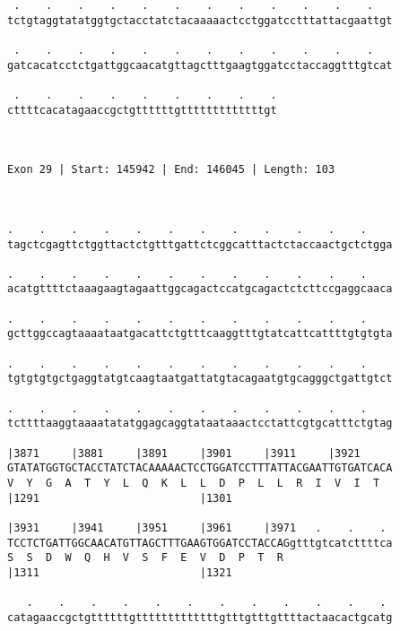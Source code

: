 \documentclass{article}
\begin{document}
\begin{Verbatim}
 .    .    .    .    .    .    .    .    .    .    .    .   
tctgtaggtatatggtgctacctatctacaaaaactcctggatcctttattacgaattgt
                                                            
 .    .    .    .    .    .    .    .    .    .    .    .   
gatcacatcctctgattggcaacatgttagctttgaagtggatcctaccaggtttgtcat
                                                            
 .    .    .    .    .    .    .    .    .
cttttcacatagaaccgctgttttttgtttttttttttttgt
                                          
                                          
 
Exon 29 | Start: 145942 | End: 146045 | Length: 103



.    .    .    .    .    .    .    .    .    .    .    .    
tagctcgagttctggttactctgtttgattctcggcatttactctaccaactgctctgga
                                                            
.    .    .    .    .    .    .    .    .    .    .    .    
acatgttttctaaagaagtagaattggcagactccatgcagactctcttccgaggcaaca
                                                            
.    .    .    .    .    .    .    .    .    .    .    .    
gcttggccagtaaaataatgacattctgtttcaaggtttgtatcattcattttgtgtgta
                                                            
.    .    .    .    .    .    .    .    .    .    .    .    
tgtgtgtgctgaggtatgtcaagtaatgattatgtacagaatgtgcagggctgattgtct
                                                            
.    .    .    .    .    .    .    .    .    .    .    .    
tcttttaaggtaaaatatatggagcaggtataataaactcctattcgtgcatttctgtag
                                                            
|3871     |3881     |3891     |3901     |3911     |3921     
GTATATGGTGCTACCTATCTACAAAAACTCCTGGATCCTTTATTACGAATTGTGATCACA
V  Y  G  A  T  Y  L  Q  K  L  L  D  P  L  L  R  I  V  I  T  
|1291                         |1301                         
  
|3931     |3941     |3951     |3961     |3971   .    .    . 
TCCTCTGATTGGCAACATGTTAGCTTTGAAGTGGATCCTACCAGgtttgtcatcttttca
S  S  D  W  Q  H  V  S  F  E  V  D  P  T  R                 
|1311                         |1321                         
  
   .    .    .    .    .    .    .    .    .    .    .    . 
catagaaccgctgttttttgtttttttttttttgtttgtttgttttactaacactgcatg
                                                            

\end{Verbatim}
\end{document}
